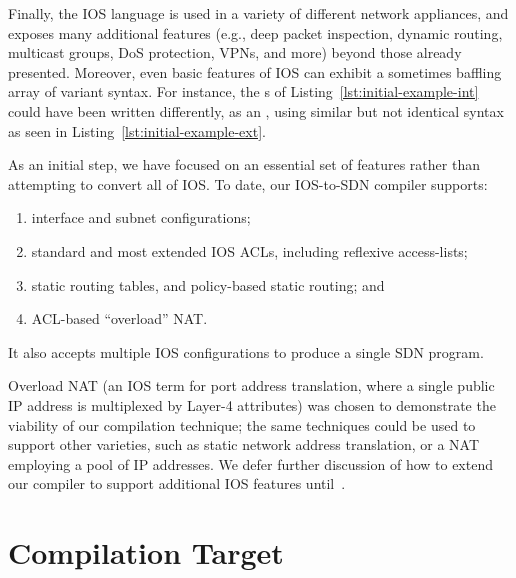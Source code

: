 Finally, the IOS language is
used in a variety of different network appliances, and exposes many additional
features (e.g., deep packet inspection, dynamic routing, multicast groups,
DoS protection, VPNs, and more) beyond those already presented.
Moreover, even basic features of IOS can exhibit a
sometimes baffling array of variant syntax. For instance, the s
of Listing~\ref{lst:initial-example-int} could have been written
differently, as an , using similar but not identical
syntax as seen in Listing~\ref{lst:initial-example-ext}.

As an initial step, we have focused on an essential set of
features rather than attempting to convert all of IOS. To date, our IOS-to-SDN
compiler supports:
\begin{enumerate}
\item interface and subnet configurations;
\item standard and most extended IOS ACLs, including reflexive access-lists;
\item static routing tables, and policy-based static routing; and
\item ACL-based ``overload'' NAT.
\end{enumerate}
It also accepts multiple IOS configurations to produce a single SDN program.

Overload NAT (an IOS term for port address translation, where a single public
IP address is multiplexed by Layer-4 attributes) was chosen to demonstrate the
viability of our compilation technique; the same techniques could be used to
support other varieties, such as static network address translation, or a NAT
employing a pool of IP addresses. We defer further discussion of how to extend our
compiler to support additional IOS features until~.




\section{Compilation Target}
\label{sec:target}

